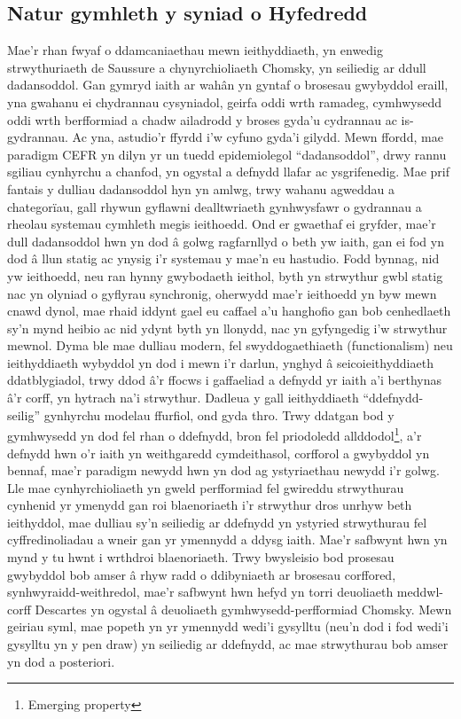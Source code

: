 \subsection{Natur gymhleth y syniad o Hyfedredd}
Mae'r rhan fwyaf o ddamcaniaethau mewn ieithyddiaeth, yn enwedig strwythuriaeth de Saussure a chynyrchioliaeth Chomsky, yn seiliedig ar ddull dadansoddol. Gan gymryd iaith ar wahân yn gyntaf o brosesau gwybyddol eraill, yna gwahanu ei chydrannau cysyniadol, geirfa oddi wrth ramadeg, cymhwysedd oddi wrth berfformiad \parencite{chomsky_aspects_1965} a chadw ailadrodd y broses gyda'u cydrannau ac is-gydrannau. Ac yna, astudio'r ffyrdd i'w cyfuno gyda'i gilydd. Mewn ffordd, mae paradigm CEFR yn dilyn yr un tuedd epidemiolegol ``dadansoddol'', drwy rannu sgiliau cynhyrchu a chanfod, yn ogystal a defnydd llafar ac ysgrifenedig. Mae prif fantais y dulliau dadansoddol hyn yn amlwg, trwy wahanu agweddau a chategorïau, gall rhywun gyflawni dealltwriaeth gynhwysfawr o gydrannau a rheolau systemau cymhleth megis ieithoedd. Ond er gwaethaf ei gryfder, mae'r dull dadansoddol hwn yn dod â golwg ragfarnllyd o beth yw iaith, gan ei fod yn dod â llun statig ac ynysig i'r systemau y mae'n eu hastudio. Fodd bynnag, nid yw ieithoedd, neu ran hynny gwybodaeth ieithol, byth yn strwythur gwbl statig nac yn olyniad o gyflyrau synchronig, oherwydd mae'r ieithoedd yn byw mewn cnawd dynol, mae rhaid iddynt gael eu caffael a'u hanghofio gan bob cenhedlaeth sy'n mynd heibio ac nid ydynt byth yn llonydd, nac yn gyfyngedig i'w strwythur mewnol. Dyma ble mae dulliau modern, fel swyddogaethiaeth (functionalism) neu ieithyddiaeth wybyddol \textcite{evans_cognitive_2009} yn dod i mewn i'r darlun, ynghyd â seicoieithyddiaeth ddatblygiadol, trwy ddod â'r ffocws i gaffaeliad a defnydd yr iaith a'i berthynas â'r corff, yn hytrach na'i strwythur. Dadleua \textcite{bybee_usage-based_1999} y gall ieithyddiaeth ``ddefnydd-seilig'' gynhyrchu modelau ffurfiol, ond gyda thro. Trwy ddatgan bod y gymhwysedd yn dod fel rhan o ddefnydd, bron fel priodoledd allddodol\footnote{Emerging property}, a'r defnydd hwn o'r iaith yn weithgaredd cymdeithasol, corfforol a gwybyddol yn bennaf, mae'r paradigm newydd hwn yn dod ag ystyriaethau newydd i'r golwg. Lle mae cynhyrchioliaeth yn gweld perfformiad fel gwireddu strwythurau cynhenid yr ymenydd gan roi blaenoriaeth i'r strwythur dros unrhyw beth ieithyddol, mae dulliau sy'n seiliedig ar ddefnydd yn ystyried strwythurau fel cyffredinoliadau a wneir gan yr ymennydd a ddysg iaith. Mae'r safbwynt hwn yn mynd y tu hwnt i wrthdroi blaenoriaeth. Trwy bwysleisio bod prosesau gwybyddol bob amser â rhyw radd o ddibyniaeth ar brosesau corffored, synhwyraidd-weithredol, mae'r safbwynt hwn hefyd yn torri deuoliaeth meddwl-corff Descartes \parencite{varela_embodied_1991} yn ogystal â deuoliaeth gymhwysedd-perfformiad Chomsky. Mewn geiriau syml, mae popeth yn yr ymennydd wedi'i gysylltu (neu'n dod i fod wedi'i gysylltu yn y pen draw) yn seiliedig ar ddefnydd, ac mae strwythurau bob amser yn dod a posteriori.

